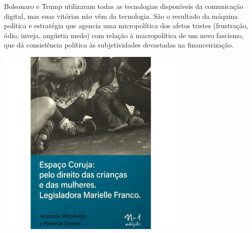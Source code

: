 Bolsonaro e Trump utilizaram todas as tecnologias disponíveis da comunicação digital, mas suas vitórias não vêm da tecnologia. São o resultado da máquina política e estratégia que agencia uma micropolítica dos afetos tristes (frustração, ódio, inveja, angústia medo) com relação à macropolítica de um novo fascismo, que dá consistência política às subjetividades devastadas na financeirização.

\vfill

\hspace*{-.4cm}\begin{minipage}[c]{.5\linewidth}
\small{
{}}
\end{minipage}

\pagebreak %

\begin{center}
\hspace*{-2.5cm}
\hspace*{2.5cm}\includegraphics[width=92mm]{./grid/coruja.jpg}
\end{center}

\hspace*{-7cm}\hrulefill\hspace*{-7cm}

